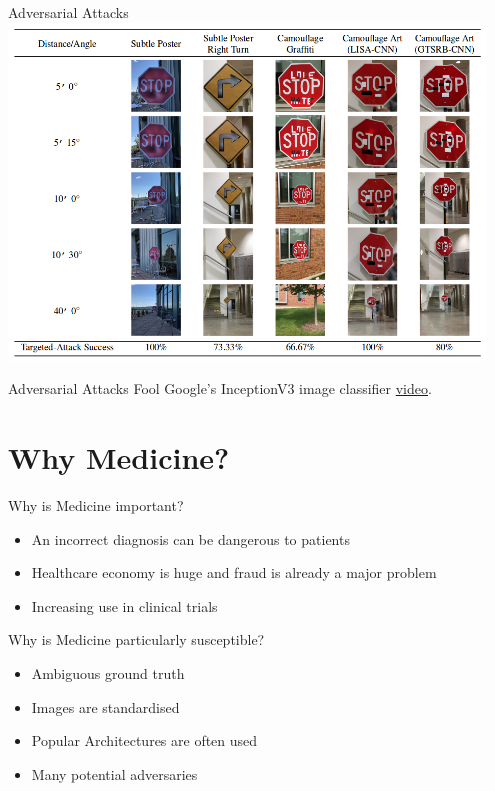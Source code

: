 \documentclass{beamer}
\begin{document}
\begin{frame}{Adversarial Attacks}
\centering
\includegraphics[width=0.95\textwidth]{./images/adverse-road-sign.png}

\cite{Eykholt_Evtimov_Fernandes_Li_Rahmati_Xiao_Prakash_Kohno_Song_2017}
\end{frame}


\begin{frame}{Adversarial Attacks}
Fool Google's InceptionV3 image classifier \href{https://www.youtube.com/watch?v=piYnd_wYlT8}{\alert{video}}.
\cite{Athalye_Engstrom_Ilyas_Kwok_2017, Ilyas_Engstrom_Athalye_Lin_2018}
\end{frame}



\section{Why Medicine?}

\begin{frame}{Why is Medicine important?}
\begin{itemize}
    \item An incorrect diagnosis can be dangerous to patients
    \pause
    \item Healthcare economy is huge and fraud is already a major problem \cite{Jain_Nundy_Abbasi_2014}
    \pause
    \item Increasing use in clinical trials \cite{Pien_Fischman_Thrall_Sorensen_2005}
\end{itemize}
\end{frame}

\begin{frame}{Why is Medicine particularly susceptible?}
\begin{itemize}
    \item Ambiguous ground truth \cite{Njeh_2008}
    \pause
    \item Images are standardised
    \pause
    \item Popular Architectures are often used
    \pause
    \item Many potential adversaries
\end{itemize}

\end{frame}
\end{document}
